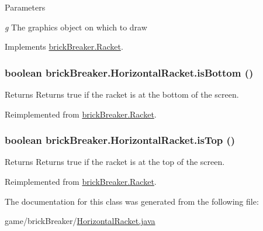 \begin{DoxyParams}{Parameters}
\item[{\em g}]The graphics object on which to draw \end{DoxyParams}


Implements \hyperlink{classbrick_breaker_1_1_racket}{brickBreaker.Racket}.

\hypertarget{classbrick_breaker_1_1_horizontal_racket_aef823257f470172eb2caacfa95a61b99}{
\subsubsection[{isBottom}]{\setlength{\rightskip}{0pt plus 5cm}boolean brickBreaker.HorizontalRacket.isBottom ()}}
\label{classbrick_breaker_1_1_horizontal_racket_aef823257f470172eb2caacfa95a61b99}
\begin{DoxyReturn}{Returns}
Returns true if the racket is at the bottom of the screen. 
\end{DoxyReturn}


Reimplemented from \hyperlink{classbrick_breaker_1_1_racket}{brickBreaker.Racket}.

\hypertarget{classbrick_breaker_1_1_horizontal_racket_a12688619999a3e4d302449ab4bcd0e3d}{
\subsubsection[{isTop}]{\setlength{\rightskip}{0pt plus 5cm}boolean brickBreaker.HorizontalRacket.isTop ()}}
\label{classbrick_breaker_1_1_horizontal_racket_a12688619999a3e4d302449ab4bcd0e3d}
\begin{DoxyReturn}{Returns}
Returns true if the racket is at the top of the screen. 
\end{DoxyReturn}


Reimplemented from \hyperlink{classbrick_breaker_1_1_racket}{brickBreaker.Racket}.



The documentation for this class was generated from the following file:\begin{DoxyCompactItemize}
\item 
game/brickBreaker/\hyperlink{_horizontal_racket_8java}{HorizontalRacket.java}\end{DoxyCompactItemize}
